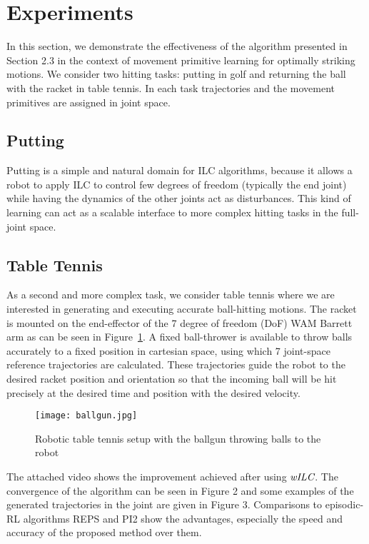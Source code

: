 \section{Experiments}\label{results}

In this section, we demonstrate the effectiveness of the algorithm presented in Section 2.3 in the context of movement primitive learning for optimally striking motions. We consider two hitting tasks: putting in golf and returning the ball with the racket in table tennis. In each task trajectories and the movement primitives are assigned in joint space. 

\subsection{Putting}

Putting is a simple and natural domain for ILC algorithms, because it allows a robot to apply ILC to control few degrees of freedom (typically the end joint) while having the dynamics of the other joints act as disturbances. This kind of learning can act as a scalable interface to more complex hitting tasks in the full-joint space.

\subsection{Table Tennis}

As a second and more complex task, we consider table tennis where we are interested in generating and executing accurate ball-hitting motions. The racket is mounted on the end-effector of the 7 degree of freedom (DoF) WAM Barrett arm as can be seen in Figure~\ref{barrettArm}. A fixed ball-thrower is available to throw balls accurately to a fixed position in cartesian space, using which 7 joint-space reference trajectories are calculated. These trajectories guide the robot to the desired racket position and orientation so that the incoming ball will be hit precisely at the desired time and position with the desired velocity. 

\begin{figure}
\center
\texttt{[image: ballgun.jpg]}			
\caption{Robotic table tennis setup with the ballgun throwing balls to the robot}
\label{barrettArm}
\end{figure}

The attached video shows the improvement achieved after using $\emph{wILC}$. The convergence of the algorithm can be seen in Figure 2 and some examples of the generated trajectories in the joint are given in Figure 3. Comparisons to episodic-RL algorithms REPS and PI2 show the advantages, especially the speed and accuracy of the proposed method over them.